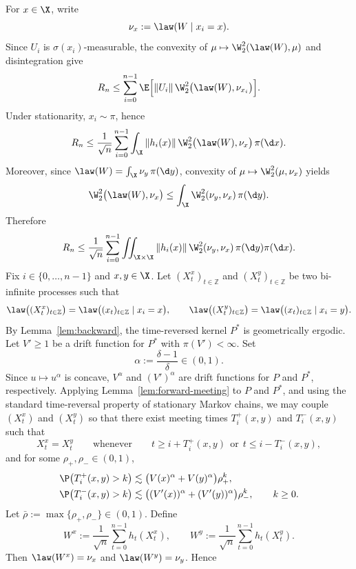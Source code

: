 \documentclass[mnsc,nonblindrev]{informs3}
\begin{document}
For \(x\in\X\), write
\[
  \nu_x:=\law(W\mid x_i=x).
\]
Since \(U_i\) is \(\sigma(x_i)\)-measurable, the convexity of
\(\mu\mapsto \W_2^2(\law(W),\mu)\) and disintegration give
\[
  R_n
  \le
  \sum_{i=0}^{n-1}
  \E\Big[
    \|U_i\|\,\W_2^2\bigl(\law(W),\nu_{x_i}\bigr)
  \Big].
\]
Under stationarity, \(x_i\sim\pi\), hence
\[
  R_n
  \le
  \frac1{\sqrt n}\sum_{i=0}^{n-1}
  \int_{\X}
    \|h_i(x)\|\,
    \W_2^2\bigl(\law(W),\nu_x\bigr)\,
  \pi(\d x).
\]
Moreover, since \(\law(W)=\int_{\X}\nu_y\,\pi(\d y)\), convexity of
\(\mu\mapsto \W_2^2(\mu,\nu_x)\) yields
\[
  \W_2^2\bigl(\law(W),\nu_x\bigr)
  \le
  \int_{\X}\W_2^2(\nu_y,\nu_x)\,\pi(\d y).
\]
Therefore
\begin{equation}\label{eq:Rn-mixture}
  R_n
  \le
  \frac1{\sqrt n}\sum_{i=0}^{n-1}
  \iint_{\X\times\X}
    \|h_i(x)\|\,
    \W_2^2(\nu_y,\nu_x)\,
  \pi(\d y)\pi(\d x).
\end{equation}
Fix \(i\in\{0,\dots,n-1\}\) and \(x,y\in\X\). Let
\((X_t^x)_{t\in\mathbb Z}\) and \((X_t^y)_{t\in\mathbb Z}\) be two bi-infinite
processes such that
\[
  \law\bigl((X_t^x)_{t\in\mathbb Z}\bigr)
  =
  \law\bigl((x_t)_{t\in\mathbb Z}\mid x_i=x\bigr),
  \qquad
  \law\bigl((X_t^y)_{t\in\mathbb Z}\bigr)
  =
  \law\bigl((x_t)_{t\in\mathbb Z}\mid x_i=y\bigr).
\]
By Lemma~\ref{lem:backward}, the time-reversed kernel \(P^\ast\) is
geometrically ergodic. Let \(V'\ge1\) be a drift function for \(P^\ast\) with
\(\pi(V')<\infty\). Set
\[
  \alpha:=\frac{\delta-1}{\delta}\in(0,1).
\]
Since \(u\mapsto u^\alpha\) is concave, \(V^\alpha\) and \((V')^\alpha\) are
drift functions for \(P\) and \(P^\ast\), respectively. Applying
Lemma~\ref{lem:forward-meeting} to \(P\) and \(P^\ast\), and using the standard
time-reversal property of stationary Markov chains, we may couple
\((X_t^x)\) and \((X_t^y)\) so that there exist meeting times
\(T_i^+(x,y)\) and \(T_i^-(x,y)\) such that
\[
  X_t^x=X_t^y
  \qquad\text{whenever}\qquad
  t\ge i+T_i^+(x,y)
  \ \ \text{or}\ \
  t\le i-T_i^-(x,y),
\]
and for some \(\rho_+,\rho_-\in(0,1)\),
\begin{align*}
  \P\bigl(T_i^+(x,y)>k\bigr)
  &\lesssim
  \bigl(V(x)^\alpha+V(y)^\alpha\bigr)\rho_+^k,\\
  \P\bigl(T_i^-(x,y)>k\bigr)
  &\lesssim
  \bigl((V'(x))^\alpha+(V'(y))^\alpha\bigr)\rho_-^k,
  \qquad k\ge0.
\end{align*}
Let \(\bar\rho:=\max\{\rho_+,\rho_-\}\in(0,1)\). Define
\[
  W^x:=\frac1{\sqrt n}\sum_{t=0}^{n-1}h_t(X_t^x),
  \qquad
  W^y:=\frac1{\sqrt n}\sum_{t=0}^{n-1}h_t(X_t^y).
\]
Then \(\law(W^x)=\nu_x\) and \(\law(W^y)=\nu_y\). Hence
\end{document}
